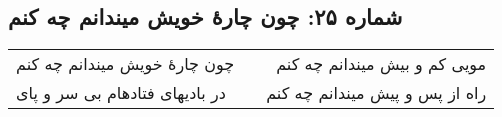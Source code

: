\begin{center}
\section*{شماره ۲۵: چون چارۀ خویش میندانم چه کنم}
\label{sec:025}
\begin{longtable}{l p{0.5cm} r}
چون چارهٔ خویش میندانم چه کنم
&&
مویی کم و بیش میندانم چه کنم
\\
در بادیهای فتادهام بی سر و پای
&&
راه از پس و پیش میندانم چه کنم
\\
\end{longtable}
\end{center}
